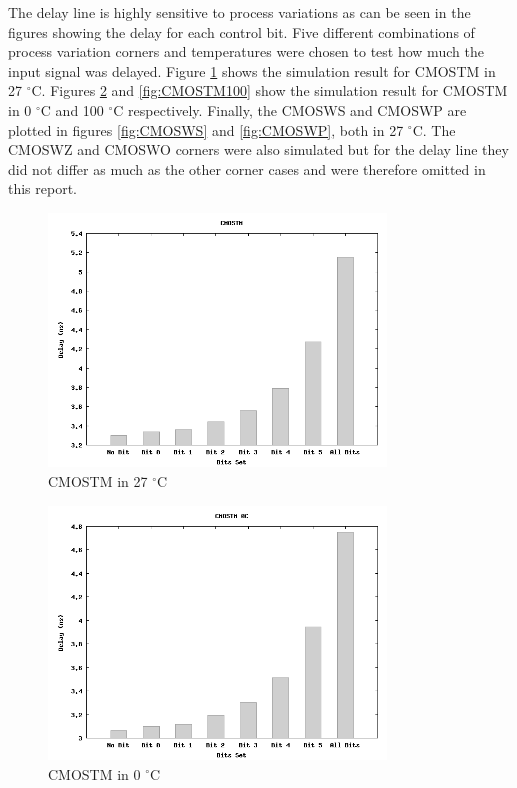\documentclass[a4paper,12pt]{article} \usepackage{graphicx}
\newcommand{\degree}{\ensuremath{^\circ}}
\begin{document}
The delay line is highly sensitive to process variations as can be seen in the
figures showing the delay for each control bit. Five different combinations of process
variation corners and temperatures were chosen to test how much the input signal
was delayed. Figure \ref{fig:CMOSTM} shows the simulation result for CMOSTM
in 27 \degree C. Figures \ref{fig:CMOSTM0} and \ref{fig:CMOSTM100} show
the simulation result for CMOSTM in 0 \degree C and 100 \degree C respectively.
Finally, the CMOSWS and CMOSWP are plotted in figures \ref{fig:CMOSWS} and
\ref{fig:CMOSWP}, both in 27 \degree C. The CMOSWZ and CMOSWO corners were also
simulated but for the delay line they did not differ as much as the other corner
cases and were therefore omitted in this report.

\begin{figure}[h!]
        \centering
        \includegraphics[width=0.8\textwidth]{../Bilder/Delay_Line/CMOSTM.png}
        \caption{CMOSTM in 27 \degree C}
        \label{fig:CMOSTM}
\end{figure}

\begin{figure}[h!]
        \centering
        \includegraphics[width=0.8\textwidth]{../Bilder/Delay_Line/CMOSTM0.png}
        \caption{CMOSTM in 0 \degree C}
        \label{fig:CMOSTM0}
\end{figure}
\end{document}
